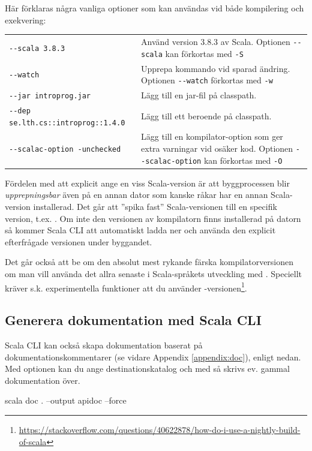 \noindent Här förklaras några vanliga optioner som kan användas vid både kompilering och exekvering: 
\begin{table}[H]
\begin{tabular}{l p{6.5cm}}
\texttt{-{}-scala 3.8.3} & Använd version 3.8.3 av Scala. Optionen \texttt{-{}-scala} kan förkortas med \texttt{-S} \\
\texttt{-{}-watch} & Upprepa kommando vid sparad ändring. Optionen \texttt{-{}-watch} förkortas med \texttt{-w} \\
\texttt{-{}-jar introprog.jar} & Lägg till en jar-fil på classpath. \\
\texttt{-{}-dep se.lth.cs::introprog::1.4.0} & Lägg till ett beroende på classpath. \\
\texttt{-{}-scalac-option -unchecked} & Lägg till en kompilator-option som ger extra varningar vid osäker kod.  Optionen \texttt{-{}-scalac-option} kan förkortas med \texttt{-O}\\
\end{tabular}
\end{table}

\noindent Fördelen med att explicit ange en viss Scala-version är att byggprocessen blir \emph{upprepningsbar} även på en annan dator som kanske råkar har en annan Scala-version installerad. Det går att ''spika fast'' Scala-versionen till en specifik version, t.ex. . Om inte den versionen av kompilatorn finns installerad på datorn så kommer Scala CLI att automatiskt ladda ner och använda den explicit efterfrågade versionen under byggandet.

Det går också att be om den absolut mest rykande färska kompilatorversionen om man vill använda det allra senaste i Scala-språkets utveckling med . Speciellt kräver s.k. experimentella funktioner att du använder -versionen\footnote{\url{https://stackoverflow.com/questions/40622878/how-do-i-use-a-nightly-build-of-scala}}. 

\subsection{Generera dokumentation med Scala CLI}

Scala CLI kan också skapa dokumentation baserat på dokumentationskommentarer (se vidare Appendix \ref{appendix:doc}), enligt nedan. Med optionen  kan du ange destinationskatalog och med  så skrivs ev. gammal dokumentation över.
\begin{REPLsmall}
scala doc . --output apidoc --force
\end{REPLsmall}


